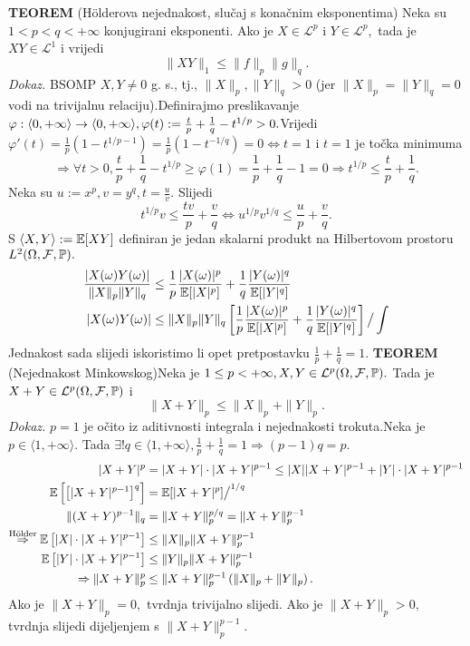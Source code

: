 \documentclass{article}
\begin{document}
\textbf{TEOREM} (H\"{o}lderova nejednakost, slučaj s konačnim eksponentima)\newline
Neka su \(1<p<q<+\infty\) konjugirani eksponenti. Ako je \(X\in\mathcal L^p\) i \(Y\in\mathcal L^p,\) tada je \(XY\in\mathcal L^1\) i vrijedi \[\|XY\|_1\le\|f\|_p\|g\|_q.\]
\textit{Dokaz.}\newline
BSOMP \(X,Y\ne 0\) g. s., tj., \(\|X\|_p,\|Y\|_q>0\) (jer \(\|X\|_p=\|Y\|_q=0\) vodi na trivijalnu relaciju).\newline Definirajmo preslikavanje \(\varphi:\langle 0,+\infty\rangle\to\Bbb\langle 0,+\infty\rangle,\varphi(t):=\frac{t}p+\frac1q-t^{1/p}>0.\)\newline Vrijedi \(\varphi'(t)=\frac1p\left(1-t^{1/p-1}\right)=\frac1p\left(1-t^{-1/q}\right)=0\Leftrightarrow t=1\) i \(t=1\) je točka minimuma \[\Rightarrow\forall t>0,\frac{t}p+\frac1q-t^{1/p}\ge\varphi(1)=\frac1p+\frac1q-1=0\Rightarrow t^{1/p}\le\frac{t}p+\frac1q.\] Neka su \(u:=x^p,v=y^q,t=\frac{u}v.\)  Slijedi \[t^{1/p}v\le\frac{tv}p+\frac{v}q\Leftrightarrow u^{1/p}v^{1/q}\le\frac{u}p+\frac{v}q.\] S \(\langle X,Y\rangle:=\Bbb E[XY]\) definiran je jedan skalarni produkt na Hilbertovom prostoru \(L^2(\Omega,\mathcal F,\Bbb P).\) \[\begin{aligned}\frac{|X(\omega)Y(\omega)|}{\|X\|_p\|Y\|_q}&\le\frac1p\frac{|X(\omega)|^p}{\Bbb E[|X|^p]}+\frac1q\frac{|Y(\omega)|^q}{\Bbb E[|Y|^q]}\\|X(\omega)Y(\omega)|&\le\|X\|_p\|Y\|_q\left[\frac1p\frac{|X(\omega)|^p}{\Bbb E[|X|^p]}+\frac1q\frac{|Y(\omega)|^q}{\Bbb E[|Y|^q]}\right]\big/\int\end{aligned}\]
Jednakost sada slijedi iskoristimo li opet pretpostavku \(\frac1p+\frac1q=1.\)\newline\newline
\textbf{TEOREM} (Nejednakost Minkowskog)\newline Neka je \(1\le p<+\infty, X,Y\in\mathcal L^p(\Omega,\mathcal F,\Bbb P).\) Tada je \(X+Y\in\mathcal L^p(\Omega,\mathcal F,\Bbb P)\) i \[\|X+Y\|_p\le\|X\|_p+\|Y\|_p.\]
\textit{Dokaz.}\newline
\(p=1\) je očito iz aditivnosti integrala i nejednakosti trokuta.\newline Neka je \(p\in\langle 1,+\infty\rangle.\) Tada \(\exists! q\in\langle 1,+\infty\rangle,\frac1p+\frac1q=1\Rightarrow (p-1)q=p.\) \[\begin{aligned}|X+Y|^p&=|X+Y|\cdot|X+Y|^{p-1}\le|X||X+Y|^{p-1}+|Y|\cdot|X+Y|^{p-1}\\\Bbb E\left[\left[|X+Y|^{p-1}\right]^q\right]&=\Bbb E[|X+Y|^p]\big/^{1/q}\\\|(X+Y)^{p-1}\|_q&=\|X+Y\|_p^{p/q}=\|X+Y\|_p^{p-1}\\\overset{\text{H\"{o}lder}}{\Rightarrow}\Bbb E\left[|X|\cdot|X+Y|^{p-1}\right]&\le\|X\|_p\|X+Y\|_p^{p-1}\\\Bbb E\left[|Y|\cdot|X+Y|^{p-1}\right]&\le\|Y\|_p\|X+Y\|_p^{p-1}\\\Rightarrow\|X+Y\|_p^p&\le\|X+Y\|_p^{p-1}\left(\|X\|_p+\|Y\|_p\right).\end{aligned}\] Ako je \(\|X+Y\|_p=0,\)  tvrdnja trivijalno slijedi. Ako je \(\|X+Y\|_p>0,\) tvrdnja slijedi dijeljenjem s \(\|X+Y\|_p^{p-1}.\)  
\newpage
\end{document}
